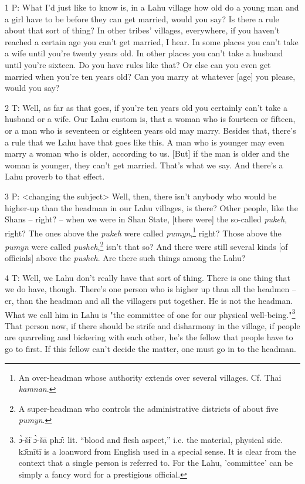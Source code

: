 
1 P: What I'd just like to know is, in a Lahu village how old do a young man and
a girl have to be before they can get married, would you say? Is there a rule about
that sort of thing? In other tribes' villages, everywhere, if you haven't reached
a certain age you can't get married, I hear. In some places you can't take a wife
until you're twenty years old. In other places you can't take a husband until you're
sixteen. Do you have rules like that? Or else can you even get married when you're
ten years old? Can you marry at whatever [age] you please, would you say?

2 T: Well, as far as that goes, if you're ten years old you certainly can't take
a husband or a wife. Our Lahu custom is, that a woman who is fourteen or fifteen,
or a man who is seventeen or eighteen years old may marry. Besides that, there's
a rule that we Lahu have that goes like this. A man who is younger may even marry
a woman who is older, according to us. [But] if the man is older and the woman
is younger, they can't get married. That's what we say. And there's a Lahu proverb
to that effect.

3 P: <changing the subject> Well, then, there isn't anybody who
would be higher-up than the headman in our Lahu villages, is there? Other people,
like the Shans -- right? -- when we were in Shan State, [there were] the so-called
\textit{pukeh}, right? The ones above the \textit{pukeh} were called \textit{pumyn},\footnote{An over-headman whose authority extends over several villages. Cf. Thai \textit{kamnan}.}
right? Those above the \textit{pumyn} were called \textit{pusheh},\footnote{A super-headman who controls the administrative districts of about five \textit{pumyn}.} isn't that
so? And there were still several kinds [of officials] above the \textit{pusheh}.
Are there such things among the Lahu?

4 T: Well, we Lahu don't really have that sort of thing. There is one thing that
we do have, though. There's one person who is higher up than all the headmen --
er, than the headman and all the villagers put together. He is not the headman.
What we call him in Lahu is "the committee of one for our physical well-being."\footnote{ɔ̀-šɨ̄ ɔ̀-šā phɔ̂: lit. ``blood and flesh aspect,'' i.e. the material, physical side. kɔ̄mītī is a loanword from English used in a special sense. It is clear from the context that a single person is referred to. For the Lahu, 'committee' can be simply a fancy word for a prestigious official.}
That person now, if there should be strife and disharmony in the village, if people
are quarreling and bickering with each other, he's the fellow that people have
to go to first. If this fellow can't decide the matter, one must go in to the headman.

